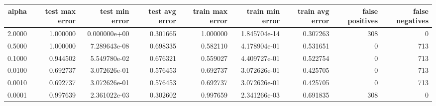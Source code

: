 
\begin{table}[ht]
\tiny
\begin{tabular}{rrrrrrrrr}
\toprule
 alpha &  test max error &  test min error &  test avg error &  train max error &  train min error &  train avg error &  false positives &  false negatives \\
\midrule
2.0000 &        1.000000 &    0.000000e+00 &        0.301665 &         1.000000 &     1.845704e-14 &         0.307263 &              308 &                0 \\
0.5000 &        1.000000 &    7.289643e-08 &        0.698335 &         0.582110 &     4.178904e-01 &         0.531651 &                0 &              713 \\
0.1000 &        0.944502 &    5.549780e-02 &        0.676321 &         0.559027 &     4.409727e-01 &         0.522754 &                0 &              713 \\
0.0100 &        0.692737 &    3.072626e-01 &        0.576453 &         0.692737 &     3.072626e-01 &         0.425705 &                0 &              713 \\
0.0010 &        0.692737 &    3.072626e-01 &        0.576453 &         0.692737 &     3.072626e-01 &         0.425705 &                0 &              713 \\
0.0001 &        0.997639 &    2.361022e-03 &        0.302602 &         0.997659 &     2.341266e-03 &         0.691835 &              308 &                0 \\
\bottomrule
\end{tabular}
\end{table}